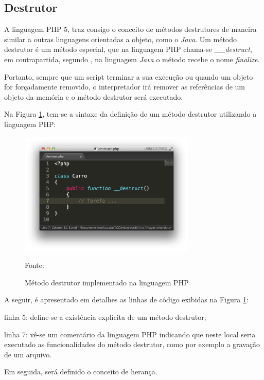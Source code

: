 \subsection{Destrutor}

A linguagem \acs{PHP} 5, traz consigo o conceito de métodos destrutores de maneira
similar a outras linguagens orientadas a objeto, como o \textit{Java}. Um método
destrutor é um método especial, que na linguagem \acs{PHP} chama-se
\textit{\_\_destruct}, em contrapartida, segundo , na
linguagem \textit{Java} o método recebe o nome \textit{finalize}.

Portanto, sempre que um script terminar a sua execução ou quando um objeto for
forçadamente removido, o interpretador irá remover as referências de um objeto
da memória e o método destrutor será executado.

Na Figura \ref{fig:metodoDestrutor}, tem-se a sintaxe da definição de um
método destrutor utilizando a linguagem \acs{PHP}:

\begin{figure}[h!tb]
	\caption{Método destrutor implementado na linguagem PHP}
	\label{fig:metodoDestrutor}

	\centering
	\includegraphics[width=0.75\textwidth]{images/destruct.png}

	\centering
	\footnotesize Fonte: \fonteOAutor
\end{figure}

\FloatBarrier 	%

A seguir, é apresentado em detalhes as linhas de código exibidas na Figura
\ref{fig:metodoDestrutor}:

\begin{alineas}
    \item linha 5: define-se a existência explícita de um método destrutor;
    \item linha 7: vê-se um comentário da linguagem \acs{PHP} indicando que
    neste local seria executado as funcionalidades do método destrutor, como
    por exemplo a gravação de um arquivo.
\end{alineas}

Em seguida, será definido o conceito de herança.